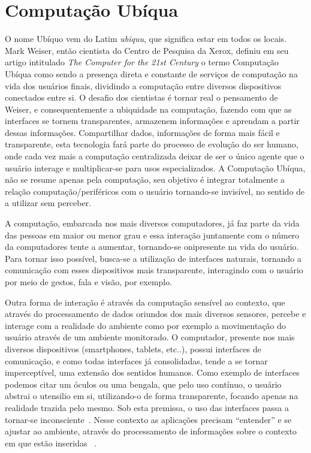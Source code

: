 \documentclass[12pt,a4paper,compsoc]{IEEEtran}
\begin{document}
\section{Computação Ubíqua}

  O nome Ubíquo vem do Latim \textit{ubiquu}, que significa estar em todos os locais. Mark Weiser,
  então cientista do Centro de Pesquisa da Xerox, definiu em seu artigo intitulado  \textit{The
  Computer for the 21st Century} o termo Computação Ubíqua como sendo a presença direta e constante
  de serviços de computação na vida dos usuários finais, dividindo a computação entre diversos
  dispositivos conectados entre si. O desafio dos cientistas é tornar real o pensamento de Weiser,
  e consequentemente a ubiquidade na computação, fazendo com que as interfaces se tornem
  transparentes, armazenem informações e aprendam a partir dessas informações. Compartilhar dados,
  informações de forma mais fácil e transparente, esta tecnologia fará parte do processo de
  evolução do ser humano, onde cada vez mais a computação centralizada deixar de ser o único agente
  que o usuário interage e multiplicar-se para usos especializados. A Computação Ubíqua,  não se
  resume apenas pela computação, seu objetivo é integrar totalmente a relação
  computação/periféricos com o usuário tornando-se  invisível, no sentido de a utilizar sem 
  perceber.
  
  A computação, embarcada nos mais diversos computadores, já faz parte da vida das pessoas em maior
  ou menor grau e essa interação juntamente com o número da computadores tente a aumentar,
  tornando-se onipresente na vida do usuário. Para tornar isso possível, busca-se a utilização de
  interfaces naturais, tornando a comunicação com esses dispositivos mais transparente, interagindo
  com o usuário por meio de gestos, fala e visão, por exemplo.
  
  Outra forma de interação é através da computação sensível ao contexto, que através do 
  processamento de dados oriundos dos mais diversos sensores, percebe e interage com a realidade do
  ambiente como por exemplo a movimentação do usuário através de um ambiente monitorado.
  O computador, presente nos mais diversos dispositivos (smartphones, tablets, etc..), possui 
  interfaces de comunicação, e como todas interfaces já consolidadas, tende a se tornar 
  imperceptível, uma extensão dos sentidos humanos. Como exemplo de interfaces podemos citar um
  óculos ou uma bengala, que pelo uso contínuo, o usuário abstrai o utensilio em si, utilizando-o
  de forma transparente, focando apenas na realidade trazida pelo mesmo. Sob esta premissa, o uso
  das interfaces passa a tornar-se inconsciente~\cite{weiser1993}. Nesse contexto as aplicações 
  precisam ``entender'' e se ajustar ao ambiente, através do processamento de informações sobre o
  contexto em que estão inseridas ~\cite{maciel2004}.
  
\end{document}

